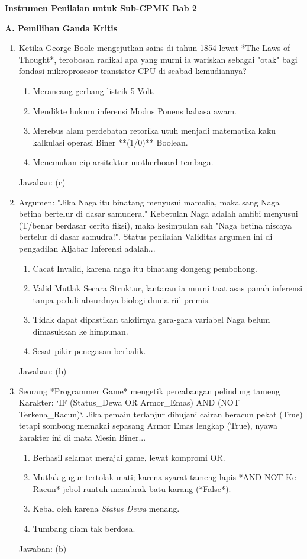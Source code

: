 \documentclass[../main]{subfiles}
\begin{document}
\begin{asesmen}
\textbf{Instrumen Penilaian untuk Sub-CPMK Bab 2}

\textbf{A. Pemilihan Ganda Kritis}

\begin{enumerate}
  \item Ketika George Boole mengejutkan sains di tahun 1854 lewat *The Laws of Thought*, terobosan radikal apa yang murni ia wariskan sebagai "otak" bagi fondasi mikroprosesor transistor CPU di seabad kemudiannya?
  \begin{enumerate}
    \item Merancang gerbang listrik 5 Volt.
    \item Mendikte hukum inferensi Modus Ponens bahasa awam.
    \item Merebus alam perdebatan retorika utuh menjadi matematika kaku kalkulasi operasi Biner **(1/0)** Boolean.
    \item Menemukan cip arsitektur motherboard tembaga.
  \end{enumerate}
  Jawaban: (c)

  \item Argumen: "Jika Naga itu binatang menyusui mamalia, maka sang Naga betina bertelur di dasar samudera." Kebetulan Naga adalah amfibi menyusui (T/benar berdasar cerita fiksi), maka kesimpulan sah "Naga betina niscaya bertelur di dasar samudra!". Status penilaian Validitas argumen ini di pengadilan Aljabar Inferensi adalah...
  \begin{enumerate}
    \item Cacat Invalid, karena naga itu binatang dongeng pembohong.
    \item Valid Mutlak Secara Struktur, lantaran ia murni taat asas panah inferensi tanpa peduli absurdnya biologi dunia riil premis.
    \item Tidak dapat dipastikan takdirnya gara-gara variabel Naga belum dimasukkan ke himpunan.
    \item Sesat pikir penegasan berbalik.
  \end{enumerate}
  Jawaban: (b)

  \item Seorang *Programmer Game* mengetik percabangan pelindung tameng Karakter: `IF (Status\_Dewa OR Armor\_Emas) AND (NOT Terkena\_Racun)`. Jika pemain terlanjur dihujani cairan beracun pekat (True) tetapi sombong memakai sepasang Armor Emas lengkap (True), nyawa karakter ini di mata Mesin Biner...
  \begin{enumerate}
    \item Berhasil selamat merajai game, lewat kompromi OR.
    \item Mutlak gugur tertolak mati; karena syarat tameng lapis *AND NOT Ke-Racun* jebol runtuh menabrak batu karang (*False*).
    \item Kebal oleh karena \textit{Status Dewa} menang.
    \item Tumbang diam tak berdosa.
  \end{enumerate}
  Jawaban: (b)
\end{enumerate}


\end{asesmen}
\end{document}
